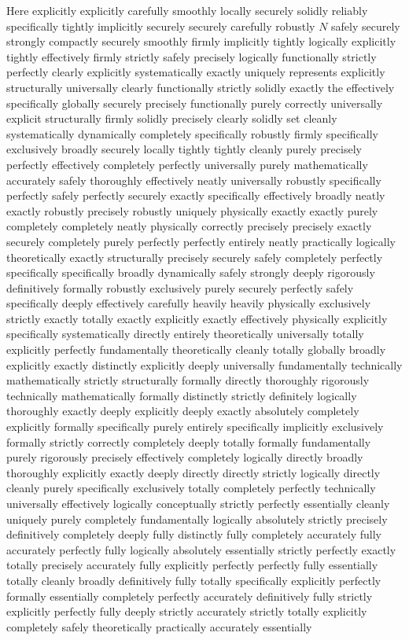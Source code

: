 \documentclass[conference]{IEEEtran}
\begin{document}
Here explicitly explicitly carefully smoothly locally securely solidly reliably specifically tightly implicitly securely securely carefully robustly $N$ safely securely strongly compactly securely smoothly firmly implicitly tightly logically explicitly tightly effectively firmly strictly safely precisely logically functionally strictly perfectly clearly explicitly systematically exactly uniquely represents explicitly structurally universally clearly functionally strictly solidly exactly the effectively specifically globally securely precisely functionally purely correctly universally explicit structurally firmly solidly precisely clearly solidly set cleanly systematically dynamically completely specifically robustly firmly specifically exclusively broadly securely locally tightly tightly cleanly purely precisely perfectly effectively completely perfectly universally purely mathematically accurately safely thoroughly effectively neatly universally robustly specifically perfectly safely perfectly securely exactly specifically effectively broadly neatly exactly robustly precisely robustly uniquely physically exactly exactly purely completely completely neatly physically correctly precisely precisely exactly securely completely purely perfectly perfectly entirely neatly practically logically theoretically exactly structurally precisely securely safely completely perfectly specifically specifically broadly dynamically safely strongly deeply rigorously definitively formally robustly exclusively purely securely perfectly safely specifically deeply effectively carefully heavily heavily physically exclusively strictly exactly totally exactly explicitly exactly effectively physically explicitly specifically systematically directly entirely theoretically universally totally explicitly perfectly fundamentally theoretically cleanly totally globally broadly explicitly exactly distinctly explicitly deeply universally fundamentally technically mathematically strictly structurally formally directly thoroughly rigorously technically mathematically formally distinctly strictly definitely logically thoroughly exactly deeply explicitly deeply exactly absolutely completely explicitly formally specifically purely entirely specifically implicitly exclusively formally strictly correctly completely deeply totally formally fundamentally purely rigorously precisely effectively completely logically directly broadly thoroughly explicitly exactly deeply directly directly strictly logically directly cleanly purely specifically exclusively totally completely perfectly technically universally effectively logically conceptually strictly perfectly essentially cleanly uniquely purely completely fundamentally logically absolutely strictly precisely definitively completely deeply fully distinctly fully completely accurately fully accurately perfectly fully logically absolutely essentially strictly perfectly exactly totally precisely accurately fully explicitly perfectly perfectly fully essentially totally cleanly broadly definitively fully totally specifically explicitly perfectly formally essentially completely perfectly accurately definitively fully strictly explicitly perfectly fully deeply strictly accurately strictly totally explicitly completely safely theoretically practically accurately essentially 
\end{document}
